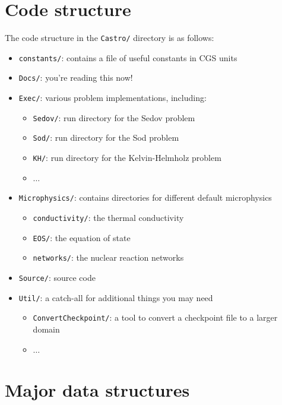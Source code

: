 \section{Code structure}

The code structure in the {\tt Castro/} directory is as follows:
\begin{itemize}
\item {\tt constants/}: contains a file of useful constants in CGS units

\item {\tt Docs/}: you're reading this now!

\item {\tt Exec/}: various problem implementations, including:
  \begin{itemize}
  \item {\tt Sedov/}: run directory for the Sedov problem
  \item {\tt Sod/}: run directory for the Sod problem
  \item {\tt KH/}: run directory for the Kelvin-Helmholz problem
  \item $\ldots$
  \end{itemize}

\item {\tt Microphysics/}: contains directories for different default microphysics
  \begin{itemize}
  \item {\tt conductivity/}: the thermal conductivity
  \item {\tt EOS/}: the equation of state
  \item {\tt networks/}: the nuclear reaction networks
  \end{itemize}

\item {\tt Source/}: source code

\item {\tt Util/}: a catch-all for additional things you may need
  \begin{itemize}
  \item {\tt ConvertCheckpoint/}: a tool to convert a checkpoint file to
     a larger domain
  \item $\ldots$
  \end{itemize}


\end{itemize}


\section{Major data structures}

